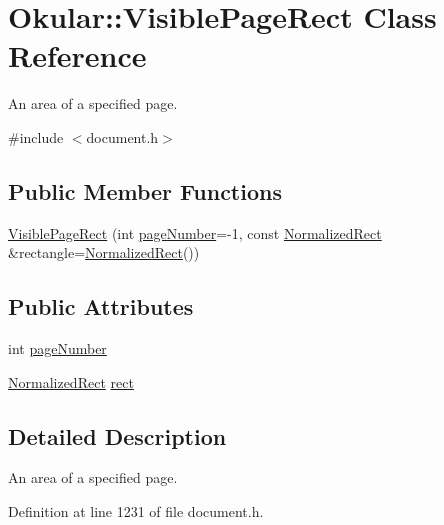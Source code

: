 \hypertarget{classOkular_1_1VisiblePageRect}{\section{Okular\+:\+:Visible\+Page\+Rect Class Reference}
\label{classOkular_1_1VisiblePageRect}
}


An area of a specified page.  




{\ttfamily \#include $<$document.\+h$>$}

\subsection*{Public Member Functions}
\begin{DoxyCompactItemize}
\item 
\hyperlink{classOkular_1_1VisiblePageRect_a33dbf112dcdab44a0d2d8073eab5fc4f}{Visible\+Page\+Rect} (int \hyperlink{classOkular_1_1VisiblePageRect_a773c60aae736669b6e09701998d45bb9}{page\+Number}=-\/1, const \hyperlink{classOkular_1_1NormalizedRect}{Normalized\+Rect} \&rectangle=\hyperlink{classOkular_1_1NormalizedRect}{Normalized\+Rect}())
\end{DoxyCompactItemize}
\subsection*{Public Attributes}
\begin{DoxyCompactItemize}
\item 
int \hyperlink{classOkular_1_1VisiblePageRect_a773c60aae736669b6e09701998d45bb9}{page\+Number}
\item 
\hyperlink{classOkular_1_1NormalizedRect}{Normalized\+Rect} \hyperlink{classOkular_1_1VisiblePageRect_a66142566f9a0db1119d95bf84ff537ba}{rect}
\end{DoxyCompactItemize}


\subsection{Detailed Description}
An area of a specified page. 

Definition at line 1231 of file document.\+h.



